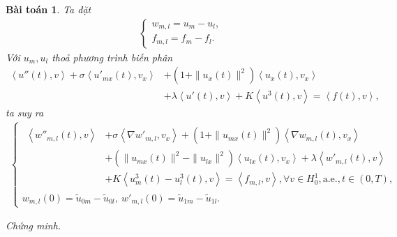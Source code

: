 \documentclass[12pt,a4paper]{article}
\newtheorem{theorem}{Bài toán}[section]
\theoremstyle{definition}
\begin{document}
\begin{theorem}
    Ta đặt
    \begin{align*}
    \begin{cases}
        w_{m,l} = u_m - u_l, \\
        f_{m,l} = f_m - f_l.
    \end{cases}
    \end{align*}
    Với $u_m,u_l$ thoả phương trình biến phân
    \begin{align*}
        \left<u''(t), v\right>
        + \sigma \left<u'_{mx}(t),v_x\right>
        &+ \left(1 + \|u_{x}(t)\|^2\right) \left<u_{x}(t),v_x\right> \\
        &+ \lambda \left<u'(t),v\right>
        + K \left<u^3(t),v\right>
        = \left<f(t),v\right>,
    \end{align*}
    ta suy ra
    \begin{align*}
    \begin{cases}
        \begin{aligned}\left<w''_{m,l}(t),v\right>
        &+ \sigma \left<\nabla w'_{m,l},v_x\right>
        + \left(1 + \|u_{mx}(t)\|^2\right) \left<\nabla w_{m,l}(t),v_x\right> \\[0.1cm]
        &+ \left(\|u_{mx}(t)\|^2 - \|u_{lx}\|^2\right) \left<u_{lx}(t),v_x\right>
        + \lambda \left<w'_{m,l}(t),v\right> \\[0.1cm]
        &+ K \left<u^3_m(t) - u^3_l(t),v\right>
        = \left<f_{m,l},v\right>, \forall v \in H^1_0, \text{a.e.}, t \in (0,T),
        \end{aligned}\\[0.3cm]
        w_{m,l}(0) = \tilde{u}_{0m} - \tilde{u}_{0l}, \  w'_{m,l}(0) = \tilde{u}_{1m} - \tilde{u}_{1l}.
    \end{cases}
    \end{align*}
\end{theorem}

\textit{Chứng minh.}
\end{document}
